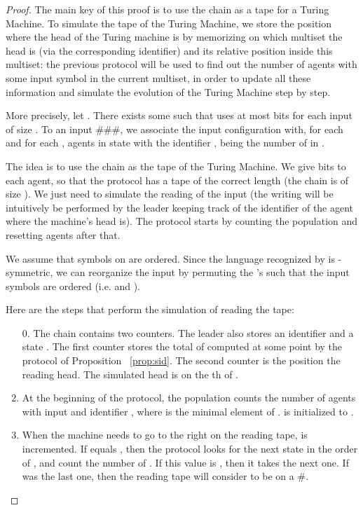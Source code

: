 \documentclass[UKenglish]{llncs}
\begin{document}
\begin{proof}
  The main key of this proof is to use the chain 
  as a tape for a Turing Machine. To simulate the tape of
  the Turing Machine, we store the position where the head of the
  Turing machine is by memorizing on which multiset the head is (via
  the corresponding identifier) and its relative position inside this
  multiset: the previous protocol will be used to find out the number of
  agents with some input symbol in the current multiset, in order to
  update all these information and simulate the evolution
  of the Turing Machine  step by step.

More precisely, let . There exists some  such that  uses at most  bits
for each input of size .
 To an input \#\#\#, we associate the input configuration
with, for each  and for each ,  agents in state  with the identifier ,
  being the number of  in .

The idea is to use the chain as the tape of the Turing Machine. We
give  bits to each agent,  so that
the protocol  has a tape of the correct length (the chain is of size ).
We just need to simulate the reading of the input (the writing
will be intuitively be performed by the leader keeping track of the identifier
of the agent where the machine's head is).
The protocol starts by counting the population and resetting agents after that.

We assume that symbols on  are ordered. Since the language recognized by  is -symmetric, we can reorganize the input by permuting the 's
such that the input symbols are ordered (i.e.  and 
).

Here are the steps that perform the simulation of reading the tape: 
\begin{enumerate}
\item[0.] The chain contains two counters. The leader also stores an identifier  and a state .
The first counter stores the total of  computed at some point by the protocol of
Proposition~ \ref{prop:sid}. The second counter  is the position the reading head.
The simulated head is on the th  of .
\item At the beginning of the protocol, the population counts the number of agents with input 
and identifier , where  is the minimal
element of .  is initialized to .
\item When the machine needs to go to the right on the reading tape, 
  is incremented. If  equals , then
the protocol looks for the next state  in the order of , and count the number of . If this
value is , then it takes the next one. If  was the last one, then the reading tape will consider to be on a \#.


\end{enumerate}
\end{proof}
\end{document}
